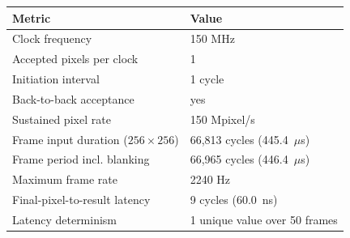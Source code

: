 \begin{tabular}{ll}
\hline
Metric & Value \\
\hline
Clock frequency & 150 MHz \\
Accepted pixels per clock & 1 \\
Initiation interval & 1 cycle \\
Back-to-back acceptance & yes \\
Sustained pixel rate & 150 Mpixel/s \\
Frame input duration ($256\times256$) & 66,813 cycles (445.4~$\mu$s) \\
Frame period incl. blanking & 66,965 cycles (446.4~$\mu$s) \\
Maximum frame rate & 2240 Hz \\
Final-pixel-to-result latency & 9 cycles (60.0~ns) \\
Latency determinism & 1 unique value over 50 frames \\
\hline
\end{tabular}
